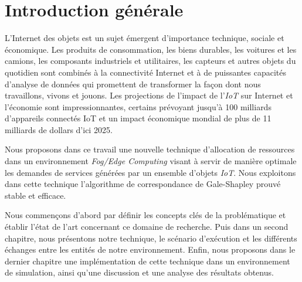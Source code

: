 \chapter{Introduction générale}
L'Internet des objets est un sujet émergent d'importance technique, sociale et économique. Les produits de consommation, les biens durables, les voitures et les camions, les composants industriels et utilitaires, les capteurs et autres objets du quotidien sont combinés à la connectivité Internet et à de puissantes capacités d'analyse de données qui promettent de transformer la façon dont nous travaillons, vivons et jouons. Les projections de l'impact de l'\emph{IoT} sur Internet et l'économie sont impressionnantes, certains prévoyant jusqu'à 100 milliards d'appareils connectés IoT et un impact économique mondial de plus de 11 milliards de dollars d'ici 2025.\par
Nous proposons dans ce travail une nouvelle technique d'allocation de ressources dans un environnement \emph{Fog/Edge Computing} visant à servir de manière optimale les demandes de services générées par un ensemble d'objets \emph{IoT}. Nous exploitons dans cette technique l'algorithme de correspondance de Gale-Shapley prouvé stable et efficace.\par
Nous commençons d'abord par définir les concepts clés de la problématique et établir l'état de l'art concernant ce domaine de recherche. Puis dans un second chapitre, nous présentons notre technique, le scénario d'exécution et les différents échanges entre les entités de notre environnement. Enfin, nous proposons dans le dernier chapitre une implémentation de cette technique dans un environnement de simulation, ainsi qu'une discussion et une analyse des résultats obtenus.